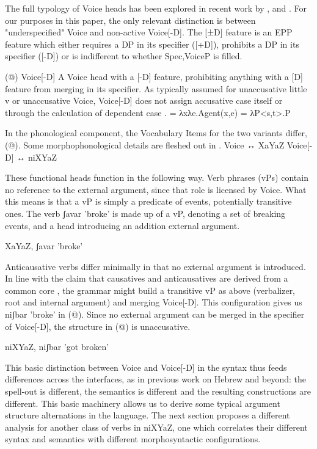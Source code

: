 The full typology of Voice heads has been explored in recent work by \cite{kastner16phd,kastner17gjgl,kastner16nllt,kastner18}, \cite{oseki17nyu} and \cite{nie17}. For our purposes in this paper, the only relevant distinction is between "underspecified" Voice and non-active Voice[-D]. The [±D] feature is an EPP feature which either requires a DP in its specifier ([+D]), prohibits a DP in its specifier ([-D]) or is indifferent to whether Spec,VoiceP is filled.

(@)    Voice[-D] \citep{kastner17gjgl}
    A Voice head with a [-D] feature, prohibiting anything with a [D] feature from merging in its specifier. 
    As typically assumed for unaccusative little v or unaccusative Voice, {Voice[-D]} does not assign accusative case itself \citep{chomsky95} or through the calculation of dependent case \citep{marantz91}.
 = λxλe.Agent(x,e)
 = λP<s,t>.P

In the phonological component, the Vocabulary Items for the two variants differ, (@). Some morphophonological details are fleshed out in \citep{kastner16nllt}.
    Voice ↔ XaYaZ
    Voice[-D] ↔ niXYaZ

These functional heads function in the following way. Verb phrases (vPs) contain no reference to the external argument, since that role is licensed by Voice. What this means is that a vP is simply a predicate of events, potentially transitive ones. The verb ʃavar 'broke' is made up of a vP, denoting a set of breaking events, and a head introducing an addition external argument.

    XaYaZ, ʃavar 'broke' 


Anticausative verbs differ minimally in that no external argument is introduced. In line with the claim that causatives and anticausatives are derived from a common core \citep{layering15}, the grammar might build a transitive vP as above (verbalizer, root and internal argument) and merging Voice[-D]. This configuration gives us niʃbar 'broke' in (@). Since no external argument can be merged in the specifier of Voice[-D], the structure in (@) is unaccusative.


    niXYaZ, niʃbar 'got broken' 


This basic distinction between Voice and Voice[-D] in the syntax thus feeds differences across the interfaces, as in previous work on Hebrew and beyond: the spell-out is different, the semantics is different and the resulting constructions are different. This basic machinery allows us to derive some typical argument structure alternations in the language. The next section proposes a different analysis for another class of verbs in niXYaZ, one which correlates their different syntax and semantics with different morphosyntactic configurations.



